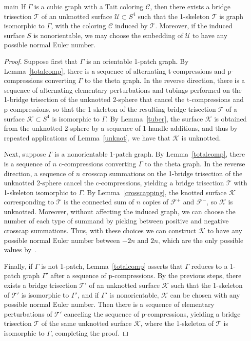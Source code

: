 \documentclass[11pt, oneside]{amsart}
\theoremstyle{theorem}
\theoremstyle{definition}
\newcommand{\F}{\mathcal{F}}
\newcommand{\K}{\mathcal{K}}
\newcommand{\T}{\mathcal{T}}
\theoremstyle{theorem}
\begin{document}
\begin{reptheorem}{main}
	If $\Gamma$ is a cubic graph with a Tait coloring $\mathcal C$, then there exists a bridge trisection $\mathcal T$ of an unknotted surface $\mathcal{U} \subset S^4$ such that the 1-skeleton $\mathcal T$ is graph isomorphic to $\Gamma$, with the coloring $\mathcal C$ induced by $\mathcal T$.  Moreover, if the induced surface $S$ is nonorientable, we may choose the embedding of $\mathcal{U}$ to have any possible normal Euler number.\end{reptheorem}
\begin{proof}
Suppose first that $\Gamma$ is an orientable 1-patch graph.  By Lemma~\ref{totalcomp}, there is a sequence of alternating t-compressions and p-compressions converting $\Gamma$ to the theta graph.  In the reverse direction, there is a sequence of alternating elementary perturbations and tubings performed on the 1-bridge trisection of the unknotted 2-sphere that cancel the t-compressions and p-compressions, so that the 1-skeleton of the resulting bridge trisection $\T$ of a surface $\K \subset S^4$ is isomorphic to $\Gamma$.  By Lemma~\ref{tuber}, the surface $\K$ is obtained from the unknotted 2-sphere by a sequence of 1-handle additions, and thus by repeated applications of Lemma~\ref{unknot}, we have that $\K$ is unknotted.

Next, suppose $\Gamma$ is a nonorientable 1-patch graph.  By Lemma~\ref{totalcomp}, there is a sequence of $n$ c-compressions converting $\Gamma$ to the theta graph.  In the reverse direction, a sequence of $n$ crosscap summations on the 1-bridge trisection of the unknotted 2-sphere cancel the c-compressions, yielding a bridge trisection $\T$ with 1-skeleton isomorphic to $\Gamma$.  By Lemma~\ref{crosscapping}, the knotted surface $\K$ corresponding to $\T$ is the connected sum of $n$ copies of $\F^+$ and $\F^-$, so $\K$ is unknotted.  Moreover, without affecting the induced graph, we can choose the number of each type of summand by picking between positive and negative crosscap summations.  Thus, with these choices we can construct $\K$ to have any possible normal Euler number between $-2n$ and $2n$, which are the only possible values by~\cite{Massey}.

Finally, if $\Gamma$ is not 1-patch, Lemma~\ref{totalcomp} asserts that $\Gamma$ reduces to a 1-patch graph $\Gamma'$ after a sequence of p-compressions.  By the previous steps, there exists a bridge trisection $\T'$ of an unknotted surface $\K$ such that the 1-skeleton of $\T'$ is isomorphic to $\Gamma'$, and if $\Gamma'$ is nonorientable, $\K$ can be chosen with any possible normal Euler number.  Then there is a sequence of elementary perturbations of $\T'$ canceling the sequence of p-compressions, yielding a bridge trisection $\T$ of the same unknotted surface $\K$, where the 1-skeleton of $\T$ is isomorphic to $\Gamma$, completing the proof.
\end{proof} 
\end{document}
